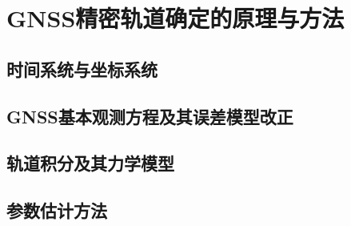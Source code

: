 
\chapter{GNSS精密轨道确定的原理与方法}

\section{时间系统与坐标系统}

\section{GNSS基本观测方程及其误差模型改正}

\section{轨道积分及其力学模型}

\section{参数估计方法}